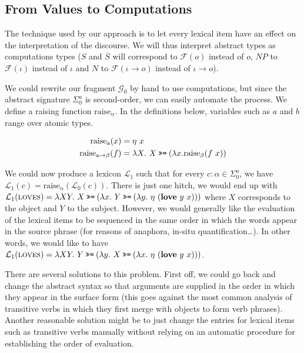 \subsection{From Values to Computations}

The technique used by our approach is to let every lexical item have an
effect on the interpretation of the discourse. We will thus interpret
abstract types as computations types ($S$ and $\overline{S}$ will
correspond to $\mathcal{F}(o)$ instead of $o$, $NP$ to $\mathcal{F}(\iota)$
instead of $\iota$ and $N$ to $\mathcal{F}(\iota \to o)$ instead of $\iota
\to o$).

We could rewrite our fragment $\mathcal{G}_0$ by hand to use computations,
but since the abstract signature $\Sigma^a_0$ is second-order, we can
easily automate the process. We define a raising function
$\mathrm{raise_\alpha}$. In the definitions below, variables such as
$a$ and $b$ range over atomic types.

\begin{align*}
  \mathrm{raise_a}(x) &= \eta\ x \\
  \mathrm{raise_{a \to \beta}}(f) &= \lambda X.\ X \mathbin{\texttt{>>=}} (\lambda
  x. \mathrm{raise_\beta}(f\ x))
\end{align*}

We could now produce a lexicon $\mathcal{L}_1$ such that for every $c :
\alpha \in \Sigma^a_0$, we have $\mathcal{L}_1(c) =
\mathrm{raise_\alpha}(\mathcal{L}_0(c))$. There is just one hitch, we
would end up with $\mathcal{L}_1(\textsc{loves}) = \lambda X Y.\ X \mathbin{\texttt{>>=}}
(\lambda x.\ Y \mathbin{\texttt{>>=}} (\lambda y.\ \eta\ (\textbf{love}\ y\ x)))$ where $X$
corresponds to the object and $Y$ to the subject. However, we would
generally like the evaluation of the lexical items to be sequenced in the
same order in which the words appear in the source phrase (for reasons of
anaphora, in-situ quantification\ldots). In other words, we would like to
have $\mathcal{L}_1(\textsc{loves}) = \lambda X Y.\ Y \mathbin{\texttt{>>=}} (\lambda y.\ X
\mathbin{\texttt{>>=}} (\lambda x.\ \eta\ (\textbf{love}\ y\ x)))$.

There are several solutions to this problem. First off, we could go back
and change the abstract syntax so that arguments are supplied in the order
in which they appear in the surface form (this goes against the most common
analysis of transitive verbs in which they first merge with objects to form
verb phrases). Another reasonable solution might be to just change the
entries for lexical items such as transitive verbs manually without relying
on an automatic procedure for establishing the order of evaluation.

